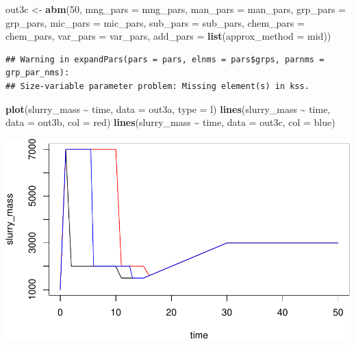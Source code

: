 \documentclass[
]{article}
\newenvironment{Shaded}{\begin{snugshade}}{\end{snugshade}}
\newcommand{\AttributeTok}[1]{\textcolor[rgb]{0.13,0.29,0.53}{#1}}
\newcommand{\DecValTok}[1]{\textcolor[rgb]{0.00,0.00,0.81}{#1}}
\newcommand{\FunctionTok}[1]{\textcolor[rgb]{0.13,0.29,0.53}{\textbf{#1}}}
\newcommand{\NormalTok}[1]{#1}
\newcommand{\OtherTok}[1]{\textcolor[rgb]{0.56,0.35,0.01}{#1}}
\newcommand{\SpecialCharTok}[1]{\textcolor[rgb]{0.81,0.36,0.00}{\textbf{#1}}}
\newcommand{\StringTok}[1]{\textcolor[rgb]{0.31,0.60,0.02}{#1}}
\begin{document}
\begin{Shaded}
\begin{Highlighting}[]
\NormalTok{out3c }\OtherTok{\textless{}{-}} \FunctionTok{abm}\NormalTok{(}\DecValTok{50}\NormalTok{,}
             \AttributeTok{mng\_pars =}\NormalTok{ mng\_pars,}
             \AttributeTok{man\_pars =}\NormalTok{ man\_pars,}
             \AttributeTok{grp\_pars =}\NormalTok{ grp\_pars,}
             \AttributeTok{mic\_pars =}\NormalTok{ mic\_pars,}
             \AttributeTok{sub\_pars =}\NormalTok{ sub\_pars,}
             \AttributeTok{chem\_pars =}\NormalTok{ chem\_pars,}
             \AttributeTok{var\_pars =}\NormalTok{ var\_pars,}
             \AttributeTok{add\_pars =} \FunctionTok{list}\NormalTok{(}\AttributeTok{approx\_method =} \StringTok{\textquotesingle{}mid\textquotesingle{}}\NormalTok{))}
\end{Highlighting}
\end{Shaded}

\begin{verbatim}
## Warning in expandPars(pars = pars, elnms = pars$grps, parnms = grp_par_nms):
## Size-variable parameter problem: Missing element(s) in kss.
\end{verbatim}

\begin{Shaded}
\begin{Highlighting}[]
\FunctionTok{plot}\NormalTok{(slurry\_mass }\SpecialCharTok{\textasciitilde{}}\NormalTok{ time, }\AttributeTok{data =}\NormalTok{ out3a, }\AttributeTok{type =} \StringTok{\textquotesingle{}l\textquotesingle{}}\NormalTok{)}
\FunctionTok{lines}\NormalTok{(slurry\_mass }\SpecialCharTok{\textasciitilde{}}\NormalTok{ time, }\AttributeTok{data =}\NormalTok{ out3b, }\AttributeTok{col =} \StringTok{\textquotesingle{}red\textquotesingle{}}\NormalTok{)}
\FunctionTok{lines}\NormalTok{(slurry\_mass }\SpecialCharTok{\textasciitilde{}}\NormalTok{ time, }\AttributeTok{data =}\NormalTok{ out3c, }\AttributeTok{col =} \StringTok{\textquotesingle{}blue\textquotesingle{}}\NormalTok{)}
\end{Highlighting}
\end{Shaded}

\includegraphics{simple_demo_files/figure-latex/unnamed-chunk-20-1.pdf}
\end{document}
